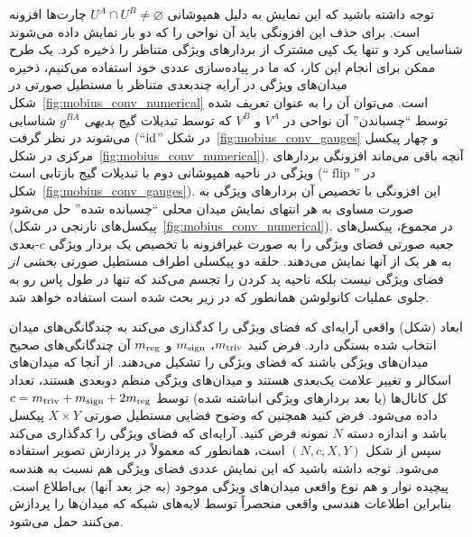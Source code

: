 توجه داشته باشید که این نمایش به دلیل همپوشانی $U^A \cap U^B \neq \varnothing$ چارت‌ها افزونه است.
برای حذف این افزونگی باید آن نواحی را که دو بار نمایش داده می‌شوند شناسایی کرد و تنها یک کپی مشترک از بردارهای ویژگی متناظر را ذخیره کرد.
یک طرح ممکن برای انجام این کار، که ما در پیاده‌سازی عددی خود استفاده می‌کنیم، ذخیره میدان‌های ویژگی در آرایه چندبعدی متناظر با مستطیل صورتی در شکل~\ref{fig:mobius_conv_numerical} است.
می‌توان آن را به عنوان تعریف شده توسط ``چسباندن'' آن نواحی در $V^A$ و $V^B$ که توسط تبدیلات گیج \emph{بدیهی} $g^{BA}$ شناسایی می‌شوند در نظر گرفت (``$\mathrm{id}$'' در شکل~\ref{fig:mobius_conv_gauges} و چهار پیکسل مرکزی در شکل~\ref{fig:mobius_conv_numerical}).
آنچه باقی می‌ماند افزونگی بردارهای ویژگی در ناحیه همپوشانی دوم با تبدیلات گیج بازتابی است (``$\operatorname{flip}$'' در شکل~\ref{fig:mobius_conv_gauges}).
این افزونگی با تخصیص آن بردارهای ویژگی به صورت مساوی به هر انتهای نمایش میدان محلی ``چسبانده شده'' حل می‌شود (پیکسل‌های نارنجی در شکل~\ref{fig:mobius_conv_numerical}).
در مجموع، پیکسل‌های جعبه صورتی فضای ویژگی را به صورت غیرافزونه با تخصیص یک بردار ویژگی $c$-بعدی به هر یک از آنها نمایش می‌دهند.
حلقه دو پیکسلی اطراف مستطیل صورتی \emph{بخشی از} فضای ویژگی نیست بلکه ناحیه پد کردن را تجسم می‌کند که تنها در طول پاس رو به جلوی عملیات کانولوشن همانطور که در زیر بحث شده است استفاده خواهد شد.

ابعاد (شکل) واقعی آرایه‌ای که فضای ویژگی را کدگذاری می‌کند به چندگانگی‌های میدان انتخاب شده بستگی دارد.
فرض کنید $m_{\textup{triv}}$، $m_{\textup{sign}}$ و $m_{\textup{reg}}$ آن چندگانگی‌های صحیح میدان‌های ویژگی باشند که فضای ویژگی را تشکیل می‌دهند.
از آنجا که میدان‌های اسکالر و تغییر علامت یک‌بعدی هستند و میدان‌های ویژگی منظم دوبعدی هستند، تعداد کل کانال‌ها (یا بعد بردارهای ویژگی انباشته شده) توسط $c = m_{\textup{triv}} + m_{\textup{sign}} + 2 m_{\textup{reg}}$ داده می‌شود.
فرض کنید همچنین که وضوح فضایی مستطیل صورتی $X\times Y$ پیکسل باشد و اندازه دسته $N$ نمونه فرض کنید.
آرایه‌ای که فضای ویژگی را کدگذاری می‌کند سپس از شکل $(N,c,X,Y)$ است، همانطور که معمولاً در پردازش تصویر استفاده می‌شود.
توجه داشته باشید که این نمایش عددی فضای ویژگی هم نسبت به هندسه پیچیده نوار و هم نوع واقعی میدان‌های ویژگی موجود (به جز بعد آنها) بی‌اطلاع است.
بنابراین اطلاعات هندسی واقعی منحصراً توسط لایه‌های شبکه که میدان‌ها را پردازش می‌کنند حمل می‌شود.



